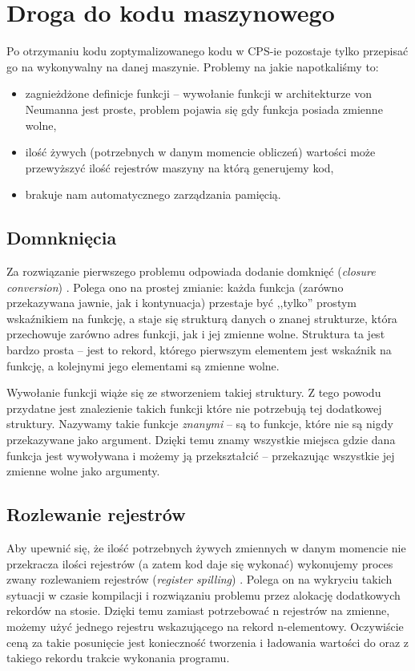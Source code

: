 \documentclass[11pt]{scrartcl}
\begin{document}
\section{Droga do kodu maszynowego}
Po otrzymaniu kodu zoptymalizowanego kodu w CPS-ie pozostaje tylko przepisać go
na wykonywalny na danej maszynie. Problemy na jakie napotkaliśmy to:
\begin{itemize}
  \item zagnieżdżone definicje funkcji -- wywołanie funkcji w architekturze von
    Neumanna jest proste, problem pojawia się gdy funkcja posiada zmienne wolne,
\item ilość żywych (potrzebnych w danym momencie obliczeń) wartości może
  przewyższyć ilość rejestrów maszyny na którą generujemy kod,
\item brakuje nam automatycznego zarządzania pamięcią.
\end{itemize}


\subsection{Domnknięcia}
Za rozwiązanie pierwszego problemu odpowiada dodanie domknięć (\textit{closure
conversion}) \cite[Chapter 10: Closure conversion]{Appel}. Polega ono na prostej zmianie: każda funkcja (zarówno przekazywana
jawnie, jak i kontynuacja) przestaje być ,,tylko'' prostym wskaźnikiem na funkcję,
a staje się strukturą danych o znanej strukturze, która przechowuje zarówno
adres funkcji, jak i jej zmienne wolne. Struktura ta jest bardzo prosta -- jest
to rekord, którego pierwszym elementem jest wskaźnik na funkcję, a kolejnymi
jego elementami są zmienne wolne.

Wywołanie funkcji wiąże się ze stworzeniem takiej struktury. Z tego powodu
przydatne jest znalezienie takich funkcji które nie potrzebują tej dodatkowej
struktury. Nazywamy takie funkcje \textit{znanymi} -- są to funkcje, które nie są nigdy
przekazywane jako argument. Dzięki temu znamy wszystkie miejsca gdzie dana
funkcja jest wywoływana i możemy ją przekształcić -- przekazując wszystkie jej
zmienne wolne jako argumenty.

\subsection{Rozlewanie rejestrów}
Aby upewnić się, że ilość potrzebnych żywych zmiennych w danym momencie nie
przekracza ilości rejestrów (a zatem kod daje się wykonać) wykonujemy proces
zwany rozlewaniem rejestrów (\textit{register spilling}) \cite[Register
spilling]{Appel}. Polega on na wykryciu
takich sytuacji w czasie kompilacji i rozwiązaniu problemu przez alokację
dodatkowych rekordów na stosie. Dzięki temu zamiast potrzebować n rejestrów na
zmienne, możemy użyć jednego rejestru wskazującego na rekord n-elementowy.
Oczywiście ceną za takie posunięcie jest konieczność tworzenia i ładowania
wartości do oraz z takiego rekordu trakcie wykonania programu.
\end{document}
